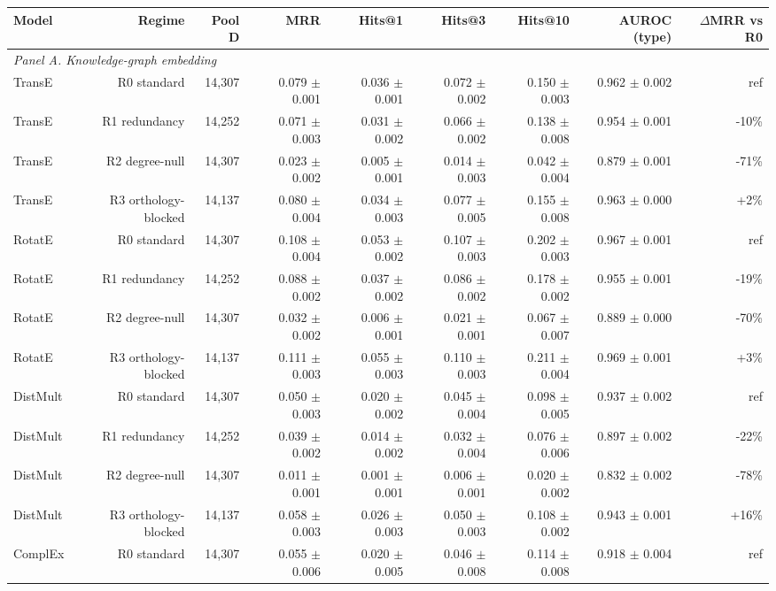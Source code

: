 \begin{table}[H]
\label{tab:fullrank_robustness}
\begin{tabular}{lrrrrrrrr}
\toprule
Model & Regime & Pool D & MRR & Hits@1 & Hits@3 & Hits@10 & AUROC (type) & $\Delta$MRR vs R0 \\
\midrule
\multicolumn{9}{l}{\textit{Panel A. Knowledge-graph embedding}} \\
TransE & R0 standard & 14,307 & 0.079 $\pm$ 0.001 & 0.036 $\pm$ 0.001 & 0.072 $\pm$ 0.002 & 0.150 $\pm$ 0.003 & 0.962 $\pm$ 0.002 & ref \\
TransE & R1 redundancy & 14,252 & 0.071 $\pm$ 0.003 & 0.031 $\pm$ 0.002 & 0.066 $\pm$ 0.002 & 0.138 $\pm$ 0.008 & 0.954 $\pm$ 0.001 & -10\% \\
TransE & R2 degree-null & 14,307 & 0.023 $\pm$ 0.002 & 0.005 $\pm$ 0.001 & 0.014 $\pm$ 0.003 & 0.042 $\pm$ 0.004 & 0.879 $\pm$ 0.001 & -71\% \\
TransE & R3 orthology-blocked & 14,137 & 0.080 $\pm$ 0.004 & 0.034 $\pm$ 0.003 & 0.077 $\pm$ 0.005 & 0.155 $\pm$ 0.008 & 0.963 $\pm$ 0.000 & +2\% \\
RotatE & R0 standard & 14,307 & 0.108 $\pm$ 0.004 & 0.053 $\pm$ 0.002 & 0.107 $\pm$ 0.003 & 0.202 $\pm$ 0.003 & 0.967 $\pm$ 0.001 & ref \\
RotatE & R1 redundancy & 14,252 & 0.088 $\pm$ 0.002 & 0.037 $\pm$ 0.002 & 0.086 $\pm$ 0.002 & 0.178 $\pm$ 0.002 & 0.955 $\pm$ 0.001 & -19\% \\
RotatE & R2 degree-null & 14,307 & 0.032 $\pm$ 0.002 & 0.006 $\pm$ 0.001 & 0.021 $\pm$ 0.001 & 0.067 $\pm$ 0.007 & 0.889 $\pm$ 0.000 & -70\% \\
RotatE & R3 orthology-blocked & 14,137 & 0.111 $\pm$ 0.003 & 0.055 $\pm$ 0.003 & 0.110 $\pm$ 0.003 & 0.211 $\pm$ 0.004 & 0.969 $\pm$ 0.001 & +3\% \\
DistMult & R0 standard & 14,307 & 0.050 $\pm$ 0.003 & 0.020 $\pm$ 0.002 & 0.045 $\pm$ 0.004 & 0.098 $\pm$ 0.005 & 0.937 $\pm$ 0.002 & ref \\
DistMult & R1 redundancy & 14,252 & 0.039 $\pm$ 0.002 & 0.014 $\pm$ 0.002 & 0.032 $\pm$ 0.004 & 0.076 $\pm$ 0.006 & 0.897 $\pm$ 0.002 & -22\% \\
DistMult & R2 degree-null & 14,307 & 0.011 $\pm$ 0.001 & 0.001 $\pm$ 0.001 & 0.006 $\pm$ 0.001 & 0.020 $\pm$ 0.002 & 0.832 $\pm$ 0.002 & -78\% \\
DistMult & R3 orthology-blocked & 14,137 & 0.058 $\pm$ 0.003 & 0.026 $\pm$ 0.003 & 0.050 $\pm$ 0.003 & 0.108 $\pm$ 0.002 & 0.943 $\pm$ 0.001 & +16\% \\
ComplEx & R0 standard & 14,307 & 0.055 $\pm$ 0.006 & 0.020 $\pm$ 0.005 & 0.046 $\pm$ 0.008 & 0.114 $\pm$ 0.008 & 0.918 $\pm$ 0.004 & ref \\

\end{tabular}
\end{table}
